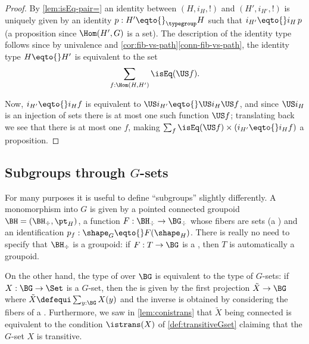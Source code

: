\begin{proof}
By \cref{lem:isEq-pair=} an identity between $(H,i_H,!)$ and $(H',i_{H'},!)$ is uniquely given by an identity $p:H'\eqto{}_{\typegroup}H$ such that $i_{H'}\eqto{}i_H\,p$ (a proposition since $\Hom(H',G)$ is a set).
The description of the identity type follows since by univalence and \cref{cor:fib-vs-path}\ref{conn-fib-vs-path}, %
the identity type $H\eqto{}H'$ is equivalent to the set
$$\sum_{f:\Hom(H,H')}\isEq(\US f).$$

Now, $i_{H'}\eqto{}i_Hf$ is equivalent to $\US i_{H'}\eqto{}\US i_H \US f$, and since $\US i_H$ is an injection of sets there is at most one such function $\US f$; translating back we see that there is at most one $f$, making $\sum_{f%
}\isEq(\US f)\times (i_{H'}\eqto{}i_H f)$ a proposition.
\end{proof}

\subsection{Subgroups through $G$-sets}

For many purposes it is useful to define ``subgroups'' slightly differently.
A monomorphism into $G$ is given by a pointed connected groupoid  $\BH=(\BH_\div,\pt_H)$, a function $F:\BH_\div\to\BG_\div$ whose fibers are sets (a \covering) and an identification $p_f:\shape_G\eqto{}F(\shape_H)$.  There is really no need to specify that $\BH_\div$ is a groupoid: if $F:T\to \BG$ is a \covering, then $T$ is automatically a groupoid.

On the other hand,  the type of \coverings over $\BG$ is equivalent to the type of $G$-sets: if $X:\BG\to\Set$ is a $G$-set, then the \covering is given by the first projection $\tilde X\to \BG$ where $\tilde X\defequi\sum_{y:\BG}X(y)$ and the inverse is obtained by considering the fibers of a \covering.  Furthermore, we saw in \cref{lem:conistrans} that $\tilde X$ being connected is equivalent to the condition $\istrans(X)$ of \cref{def:transitiveGset} claiming that the $G$-set $X$ is transitive.

